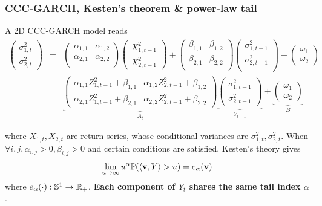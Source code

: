\documentclass{beamer}
\begin{document}
\begin{frame}
  \frametitle{CCC-GARCH, Kesten's theorem \& power-law tail}
  A 2D CCC-GARCH model reads
  \begin{eqnarray*}
    \begin{pmatrix}
      \sigma_{1, t}^2 \\
      \sigma_{2, t}^2
    \end{pmatrix}
    &=&
    \begin{pmatrix}
      \alpha_{1, 1} & \alpha_{1, 2} \\
      \alpha_{2, 1} & \alpha_{2, 2} \\
    \end{pmatrix}
    \begin{pmatrix}
      X_{1, t-1}^2 \\
      X_{2, t-1}^2
    \end{pmatrix}
    +
    \begin{pmatrix}
      \beta_{1, 1} & \beta_{1, 2} \\
      \beta_{2, 1} & \beta_{2, 2} \\
    \end{pmatrix}
    \begin{pmatrix}
      \sigma_{1,t-1}^2 \\
      \sigma_{2,t-1}^2 \\
    \end{pmatrix}
    +
    \begin{pmatrix}
      \omega_1 \\
      \omega_2
    \end{pmatrix} \\
    &=&
    \underbrace{
      \begin{pmatrix}
        \alpha_{1,1} Z_{1,t-1}^2 + \beta_{1,1} & \alpha_{1,2} Z_{2,t-1}^2 + \beta_{1,2} \\
        \alpha_{2,1} Z_{1,t-1}^2 + \beta_{2,1} & \alpha_{2,2} Z_{2,t-1}^2 + \beta_{2,2}
      \end{pmatrix}
    }_{A_t}
    \underbrace{
      \begin{pmatrix}
        \sigma_{1,t-1}^2 \\
        \sigma_{2,t-1}^2
      \end{pmatrix}
    }_{Y_{t-1}}
    +
    \underbrace{
      \begin{pmatrix}
        \omega_1 \\
        \omega_2
      \end{pmatrix}
    }_{B}
  \end{eqnarray*}
  \begin{small}
    where $X_{1, t}, X_{2, t}$ are return series, whose conditional
    variances are $\sigma_{1, t}^2, \sigma_{2, t}^2$.
    When $\forall i,j, \alpha_{i, j} > 0, \beta_{i,j} > 0$ and certain
    conditions are satisfied, Kesten's theory \cite{kesten:1973} gives
    \[
    \lim_{u \to \infty} u^{\alpha}
    \mathbb{P}(\langle\mathbf{v}, Y\rangle > u) = e_\alpha(\mathbf{v})
    \]
    where $e_\alpha(\cdot): \mathbb S^{1} \to \mathbb R_+$.
    {\bf Each component of $Y_t$ shares the same tail index $\alpha$}.
  \end{small}
  
\end{frame}
\end{document}
